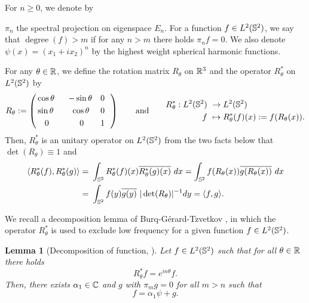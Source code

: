 \documentclass[11pt, reqno]{amsart}
\numberwithin{equation}{section}
\newcommand{\R}{\Bbb R}
\newtheorem{lemma}[theorem]{Lemma}
\theoremstyle{definition}
\theoremstyle{remark}
\begin{document}
For $n\ge0$, we denote by {$\pi_n$  the spectral projection on eigenspace $E_n$. For a function $f \in L^2(\Bbb S^2)$, we say that $\operatorname{degree}(f)>m$ if for any $n>m$ there holds $\pi_n f=0$. We also denote ${\psi(x)=(x_1+ix_2)^n}$ by the highest weight spherical harmonic functions.
	
For any $ \theta \in \R $, we define the rotation matrix $ R_{\theta} $ on $ \R^3 $ and the operator $ R_{\theta}^{*} $ on $ L^2(\Bbb S^2) $ by
\begin{equation*}
R_{\theta} := \left(
\begin{aligned}
& \cos \theta & ~~ -\sin \theta & \quad 0 ~~ \\
& \sin \theta & ~~ \cos \theta ~ & \quad 0 ~~ \\
& \quad 0 & 0 \quad & \quad 1 ~~
\end{aligned}\right)
\qquad \text{and} \qquad
\begin{aligned}
R_{\theta}^{*} : L^2(\Bbb S^2) & ~ \to L^2(\Bbb S^2) \\
f & ~ \mapsto R_{\theta}^{*}(f)(x) := f(R_{\theta}(x)).
\end{aligned}
\end{equation*}
Then, $ R_{\theta}^{*} $ is an unitary operator on $ L^2(\Bbb S^2) $ from the two facts below that $ \det(R_{\theta}) \equiv 1 $ and
\begin{equation*}
\begin{aligned}
\langle R_{\theta}^{*}(f), R_{\theta}^{*}(g) \rangle
= & ~ \int_{\Bbb S^2} R_{\theta}^{*}(f)(x) \overline{R_{\theta}^{*}(g)(x)} ~ dx
= \int_{\Bbb S^2} f(R_{\theta}(x)) \overline{g(R_{\theta}(x))} ~ dx \\
= & ~ \int_{\Bbb S^2} f(y) \overline{g(y)} ~ \vert \det(R_{\theta}) \vert^{-1} dy
= \langle f, g \rangle.
\end{aligned}
\end{equation*}
	
We recall a decomposition lemma of Burq-G\'erard-Tzvetkov \cite{Burq2001}, in which the operator $R^*_\theta$ is used to exclude low frequency for a given function $f\in L^2(\Bbb S^2)$.

\begin{lemma}[Decomposition of function, \cite{Burq2001}]\label{lem-rotation}
Let $f\in L^2(\Bbb S^2)$ such that for all $\theta\in\R$ there holds
\begin{equation*}
R^*_\theta f = e^{in\theta} f.
\end{equation*}
Then, there exists $\alpha_1\in\Bbb C$ and $g$ with $\pi_m g=0$ for all $m>n$ such that
\begin{equation*}
f = \alpha_1 \psi + g.
\end{equation*}
\end{lemma}
	
}
\end{document}
